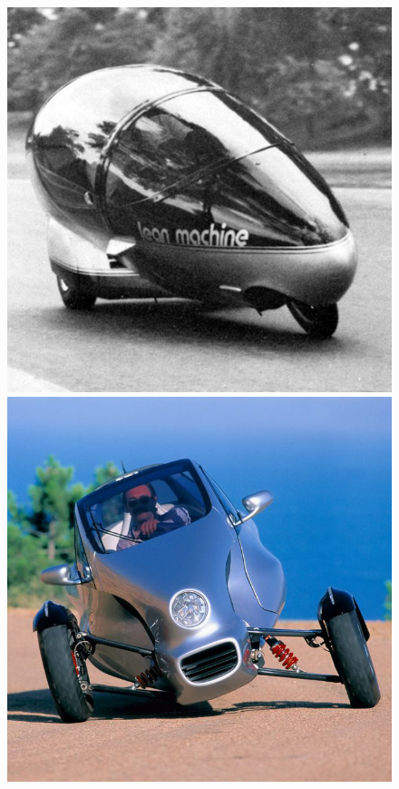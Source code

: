 \begin{figure}[h]
		  \includegraphics[width=1.0\linewidth]{figs/02/gmlean}
		\endminipage\hfill
		  \includegraphics[width=1.0\linewidth]{figs/02/mercedes}

\end{figure}
